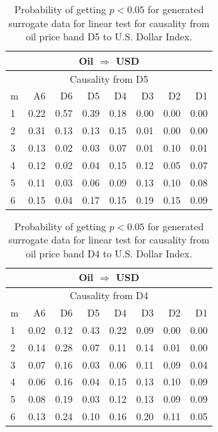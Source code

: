 %
%
\begin{table}[H]
\begin{center}
\begin{tabular}{l|r r r r r r r}
\hline\hline
\multicolumn{8}{c}{Oil $\Rightarrow$ USD}\\
\hline
\multicolumn{8}{c}{Causality from D5}\\
\hline\hline
m & A6 & D6 & D5 & D4 & D3 & D2 & D1 \\
\hline
1 & \cellcolor{mygrey}0.22 & 0.57 & \cellcolor{mygrey}0.39 & 0.18 & 0.00 & 0.00 & 0.00 \\
2 & \cellcolor{mygrey}0.31 & 0.13 & 0.13 & 0.15 & 0.01 & 0.00 & 0.00 \\
3 & 0.13 & 0.02 & 0.03 & 0.07 & 0.01 & \cellcolor{mygrey}0.10 & 0.01 \\
4 & 0.12 & 0.02 & 0.04 & 0.15 & \cellcolor{mygrey}0.12 & 0.05 & 0.07 \\
5 & 0.11 & 0.03 & 0.06 & 0.09 & \cellcolor{mygrey}0.13 & 0.10 & 0.08 \\
6 & 0.15 & 0.04 & 0.17 & 0.15 & \cellcolor{mygrey}0.19 & 0.15 & 0.09 \\
\hline\hline
\end{tabular}
\caption{Probability of getting $p < 0.05$ for generated surrogate data for linear test for causality from oil price band D5 to U.S. Dollar Index.}
\end{center}
\end{table}

%
%
\begin{table}[H]
\begin{center}
\begin{tabular}{l|r r r r r r r}
\hline\hline
\multicolumn{8}{c}{Oil $\Rightarrow$ USD}\\
\hline
\multicolumn{8}{c}{Causality from D4}\\
\hline\hline
m & A6 & D6 & D5 & D4 & D3 & D2 & D1 \\
\hline
1 & 0.02 & \cellcolor{mygrey}0.12 & \cellcolor{mygrey}0.43 & 0.22 & 0.09 & 0.00 & 0.00 \\
2 & 0.14 & \cellcolor{mygrey}0.28 & 0.07 & 0.11 & 0.14 & 0.01 & 0.00 \\
3 & 0.07 & 0.16 & 0.03 & 0.06 & 0.11 & 0.09 & 0.04 \\
4 & 0.06 & 0.16 & 0.04 & 0.15 & 0.13 & 0.10 & 0.09 \\
5 & 0.08 & \cellcolor{mygrey}0.19 & 0.03 & 0.12 & 0.13 & 0.09 & \cellcolor{mygreen}0.09 \\
6 & 0.13 & \cellcolor{mygrey}0.24 & 0.10 & 0.16 & 0.20 & 0.11 & \cellcolor{mygreen}0.05 \\
\hline\hline
\end{tabular}
\caption{Probability of getting $p < 0.05$ for generated surrogate data for linear test for causality from oil price band D4 to U.S. Dollar Index.}
\end{center}
\end{table}

